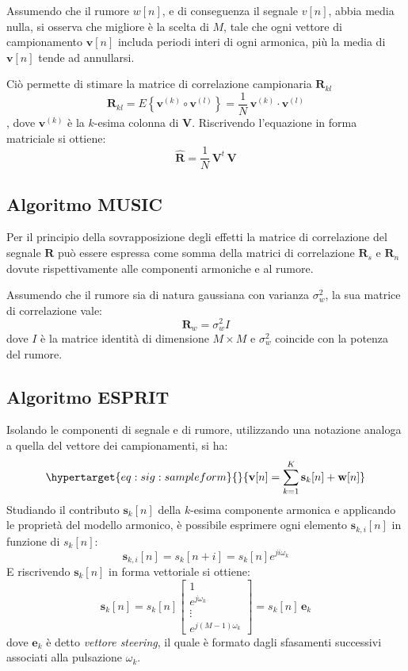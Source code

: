 \documentclass[
  italian,
]{article}
\begin{document}
Assumendo che il rumore \(w[n]\), e di conseguenza il segnale \(v[n]\),
abbia media nulla, si osserva che migliore è la scelta di \(M\), tale
che ogni vettore di campionamento \(\mathbf{v}[n]\) includa periodi
interi di ogni armonica, più la media di \(\mathbf{v}[n]\) tende ad
annullarsi.

Ciò permette di stimare la matrice di correlazione campionaria
\(\mathbf{R}_{kl}\) \[
\hat{\mathbf{R}}_{kl} = \mathit{E} \left\{
    \mathbf{v}^{(k)} \circ \mathbf{v}^{(l)}
\right\}
  = \frac{1}{N} \, \mathbf{v}^{(k)} \cdot \mathbf{v}^{(l)}
\] , dove \(\mathbf{v}^{(k)}\) è la \(k\)-esima colonna di
\(\mathbf{V}\). Riscrivendo l'equazione in forma matriciale si ottiene:
\[
\hat{\mathbf{R}} = \frac{1}{N} \, \mathbf{V}^t \, \mathbf{V}
\]

\hypertarget{algoritmo-music}{%
\subsection{Algoritmo MUSIC}\label{algoritmo-music}}

Per il principio della sovrapposizione degli effetti la matrice di
correlazione del segnale \(\mathbf{R}\) può essere espressa come somma
della matrici di correlazione \(\mathbf{R}_s\) e \(\mathbf{R}_n\) dovute
rispettivamente alle componenti armoniche e al rumore.

Assumendo che il rumore sia di natura gaussiana con varianza
\(\sigma_w^2\), la sua matrice di correlazione vale: \[
\mathbf{R}_w = \sigma_w^2 I
\] dove \(I\) è la matrice identità di dimensione \(M \times M\) e
\(\sigma_w^2\) coincide con la potenza del rumore.

\hypertarget{algoritmo-esprit}{%
\subsection{Algoritmo ESPRIT}\label{algoritmo-esprit}}

Isolando le componenti di segnale e di rumore, utilizzando una notazione
analoga a quella del vettore dei campionamenti, si ha:
\begin{equation}\protect\hypertarget{eq:sig:sampleform}{}{
\mathbf{v}[n] = \sum_{k=1}^K \mathbf{s}_k[n] + \mathbf{w}[n]
}\label{eq:sig:sampleform}\end{equation} Studiando il contributo
\(\mathbf{s}_k[n]\) della \(k\)-esima componente armonica e applicando
le proprietà del modello armonico, è possibile esprimere ogni elemento
\(\mathbf{s}_{k,i}[n]\) in funzione di \(s_k[n]\): \[
\mathbf{s}_{k,i}[n] = s_k[n + i] = s_k[n] e^{j i \omega_k}
\] E riscrivendo \(\mathbf{s}_k[n]\) in forma vettoriale si ottiene: \[
\mathbf{s}_{k}[n] = s_k[n]
\begin{bmatrix}
    1 \\
    e^{j \omega_k} \\
    \vdots \\
    e^{j (M-1) \omega_k}
\end{bmatrix} =
s_k[n] \, \mathbf{e}_k
\] dove \(\mathbf{e}_k\) è detto \emph{vettore steering}, il quale è
formato dagli sfasamenti successivi associati alla pulsazione
\(\omega_k\).
\end{document}
